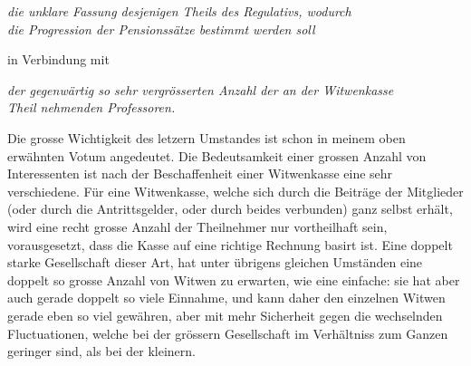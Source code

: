 \documentclass[12pt,a4paper]{article}
\begin{document}
\begin{center}
\textit{die unklare Fassung desjenigen Theils des Regulativs, wodurch\\die Progression der Pensionss\"atze bestimmt werden soll}
\end{center}

\begin{center}
in Verbindung mit
\end{center}

\begin{center}
\textit{der gegenw\"artig so sehr vergr\"osserten Anzahl der an der Witwenkasse\\Theil nehmenden Professoren.}
\end{center}

Die grosse Wichtigkeit des letzern Umstandes ist schon in meinem oben erw\"ahnten Votum angedeutet. Die Bedeutsamkeit einer grossen Anzahl von Interessenten ist nach der Beschaffenheit einer Witwenkasse eine sehr verschiedene. F\"ur eine Witwenkasse, welche sich durch die Beitr\"age der Mitglieder (oder durch die Antrittsgelder, oder durch beides verbunden) ganz selbst erh\"alt, wird eine recht grosse Anzahl der Theilnehmer nur vortheilhaft sein, vorausgesetzt, dass die Kasse auf eine richtige Rechnung basirt ist. Eine doppelt starke Gesellschaft dieser Art, hat unter \"ubrigens gleichen Umst\"anden eine doppelt so grosse Anzahl von Witwen zu erwarten, wie eine einfache: sie hat aber auch gerade doppelt so viele Einnahme, und kann daher den einzelnen Witwen gerade eben so viel gew\"ahren, aber mit mehr Sicherheit gegen die wechselnden Fluctuationen, welche bei der gr\"ossern Gesellschaft im Verh\"altniss zum Ganzen geringer sind, als bei der kleinern.
\end{document}
